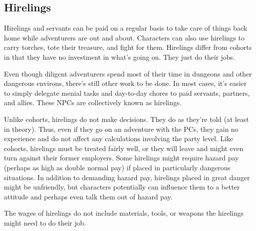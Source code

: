 \subsection{Hirelings}
Hirelings and servants can be paid on a regular basis to take care of things back home while adventurers are out and about. Characters can also use hirelings to carry torches, tote their treasure, and fight for them. Hirelings differ from cohorts in that they have no investment in what's going on. They just do their jobs.

Even though diligent adventurers spend most of their time in dungeons and other dangerous environs, there's still other work to be done. In most cases, it's easier to simply delegate menial tasks and day-to-day chores to paid servants, partners, and allies. These NPCs are collectively known as hirelings.

Unlike cohorts, hirelings do not make decisions. They do as they're told (at least in theory). Thus, even if they go on an adventure with the PCs, they gain no experience and do not affect any calculations involving the party level. Like cohorts, hirelings must be treated fairly well, or they will leave and might even turn against their former employers. Some hirelings might require hazard pay (perhaps as high as double normal pay) if placed in particularly dangerous situations. In addition to demanding hazard pay, hirelings placed in great danger might be unfriendly, but characters potentially can influence them to a better attitude and perhaps even talk them out of
hazard pay.

The wages of hirelings do not include materials, tools, or weapons the hirelings might need to do their job.

